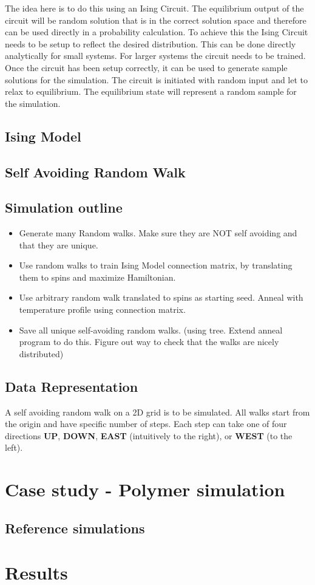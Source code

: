 \documentclass[11pt]{article}
\begin{document}
The idea here is to do this using an Ising Circuit. The equilibrium output of the circuit will be random solution that is in the correct solution space and therefore can be used directly in a probability calculation. To achieve this the Ising Circuit needs to be setup to reflect the desired distribution. This can be done directly analytically for small systems. For larger systems the circuit needs to be trained. Once the circuit has been setup correctly, it can be used to generate sample solutions for the simulation. The circuit is initiated with random input and let to relax to equilibrium. The equilibrium state will represent a random sample for the simulation.
\subsection{Ising Model}
\subsection{Self Avoiding Random Walk}
\subsection{Simulation outline}
\begin{itemize}
\item Generate many Random walks. Make sure they are NOT self avoiding and that they are unique.
\item Use random walks to train Ising Model connection matrix, by translating them to spins and maximize Hamiltonian.
\item Use arbitrary random walk translated to spins as starting seed. Anneal with temperature profile using connection matrix.
\item Save all unique self-avoiding random walks. (using tree. Extend anneal program to do this. Figure out way to check that the walks are nicely distributed)
\end{itemize}

\subsection{Data Representation}
A self avoiding random walk on a 2D grid is to be simulated. All walks start from the origin and have specific number of steps. Each step can take one of four directions \textbf{UP}, \textbf{DOWN}, \textbf{EAST} (intuitively to the right),  or \textbf{WEST} (to the left).
\section{Case study - Polymer simulation}
\subsection{Reference simulations}


\section{Results}


\end{document}
